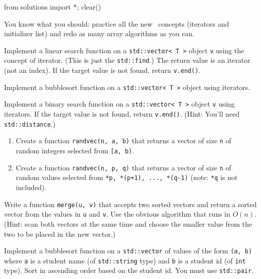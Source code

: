 \begin{python0}
from solutions import *; clear()
\end{python0}

You know what you should:
practice all the new \cpp\ concepts (iterators and initializer list)
and redo as many array algorithms as you can.

\begin{ex}
  Implement a linear search function on a \verb!std::vector< T >!
  object \verb!v! using the concept of iterator.
  (This is just the \verb!std::find!.)
  The return value is an iterator (not an index).
  If the target value is not found, return \verb!v.end()!.
\end{ex}

\begin{ex}
  Implement a bubblesort function on a \verb!std::vector< T >!
  object using iterators.
\end{ex}

\begin{ex}
  Implement a binary search function on a \verb!std::vector< T >!
  object \verb!v! using iterators.
  If the target value is not found, return \verb!v.end()!.
  (Hint: You'll need \verb!std::distance!.)
\end{ex}

\begin{ex}\mbox{}
  \begin{enumerate}[nosep]
  \item
    Create a function \verb!randvec(n, a, b)!
    that returns a vector of size \verb!n!
    of random integers selected from \verb![a, b)!.
  \item
    Create a function \verb!randvec(n, p, q)!
    that returns a vector of size \verb!n!
    of random values selected from \verb!*p, *(p+1), ..., *(q-1)! (note:
    \verb!*q! is not included).
  \end{enumerate}
\end{ex}

\begin{ex}
  Write a function \verb!merge(u, v)! that accepts two
  sorted vectors and return a sorted vector from the values in
  \verb!u! and \verb!v!.
  Use the obvious algorithm that runs in $O(n)$.
  (Hint: scan both vectors at the same time and choose the smaller
  value from the two to be placed in the new vector.)
\end{ex}

\begin{ex}
  Implement a bubblesort function on a \verb!std::vector! of values
  of the form \verb!(a, b)! where \verb!a! is a student name (of \verb!std::string! type)
  and \verb!b! is a student id (of \verb!int! type).
  Sort in ascending order based on the student id.
  You must use \verb!std::pair!.
\end{ex}

